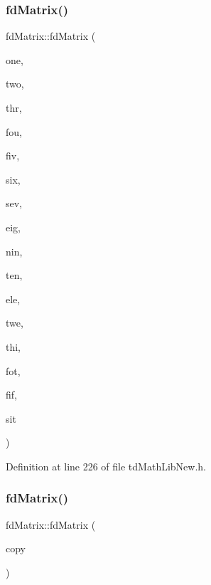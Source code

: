 \subsubsection{\texorpdfstring{fd\+Matrix()}{fdMatrix()}\hspace{0.1cm}{\footnotesize\ttfamily [2/3]}}
{\footnotesize\ttfamily fd\+Matrix\+::fd\+Matrix (\begin{DoxyParamCaption}\item[{float}]{one,  }\item[{float}]{two,  }\item[{float}]{thr,  }\item[{float}]{fou,  }\item[{float}]{fiv,  }\item[{float}]{six,  }\item[{float}]{sev,  }\item[{float}]{eig,  }\item[{float}]{nin,  }\item[{float}]{ten,  }\item[{float}]{ele,  }\item[{float}]{twe,  }\item[{float}]{thi,  }\item[{float}]{fot,  }\item[{float}]{fif,  }\item[{float}]{sit }\end{DoxyParamCaption})\hspace{0.3cm}{\ttfamily [inline]}}



Definition at line 226 of file td\+Math\+Lib\+New.\+h.

\hypertarget{classfd_matrix_aeaeab2c9d844bcbe721c2dba9f6c0b9d}{}\label{classfd_matrix_aeaeab2c9d844bcbe721c2dba9f6c0b9d} 
\subsubsection{\texorpdfstring{fd\+Matrix()}{fdMatrix()}\hspace{0.1cm}{\footnotesize\ttfamily [3/3]}}
{\footnotesize\ttfamily fd\+Matrix\+::fd\+Matrix (\begin{DoxyParamCaption}\item[{const \hyperlink{classfd_matrix}{fd\+Matrix} \&}]{copy }\end{DoxyParamCaption})\hspace{0.3cm}{\ttfamily [inline]}}



